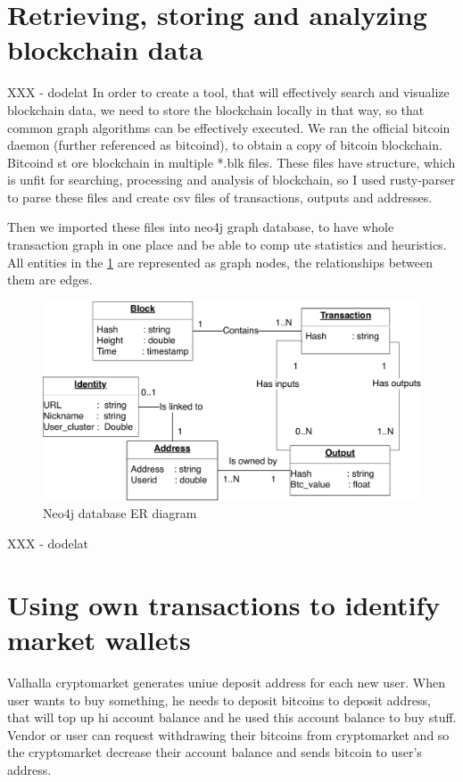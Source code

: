 \documentclass[
  digital, %
  table,   %
  lof,     %
  lot,     %
  oneside
]{fithesis3}
\begin{document}
\section{Retrieving, storing and analyzing blockchain data}
XXX - dodelat
In order to create a tool, that will effectively search and visualize blockchain data,
we need to store the blockchain locally in that way, so that common graph algorithms can be effectively executed.
We ran the official bitcoin daemon (further referenced as bitcoind), to obtain a copy of bitcoin blockchain. Bitcoind st
ore blockchain in multiple *.blk files.
These files have structure, which is unfit for searching, processing and analysis of blockchain, so I used rusty-parser 
to parse these files and create csv files of transactions, outputs and addresses.

Then we imported these files into neo4j graph database, to have whole transaction graph in one place and be able to comp
ute statistics and heuristics.
All entities in the \ref{neo4jschema} are represented as graph nodes, the relationships between them are edges.
\begin{figure}[!htb]
    \centering
    \includegraphics[width=1\textwidth]{neo4j-schema}
    \caption{Neo4j database ER diagram}
    \label{neo4jschema}
\end{figure}
XXX - dodelat

\section{Using own transactions to identify market wallets}

Valhalla cryptomarket generates uniue deposit address for each new user.
When user wants to buy something, he needs to deposit bitcoins to deposit address,
that will top up hi account balance and he used this account balance to buy stuff.
Vendor or user can request withdrawing their bitcoins from cryptomarket and so
the cryptomarket decrease their account balance and sends bitcoin to user's address.
\end{document}
